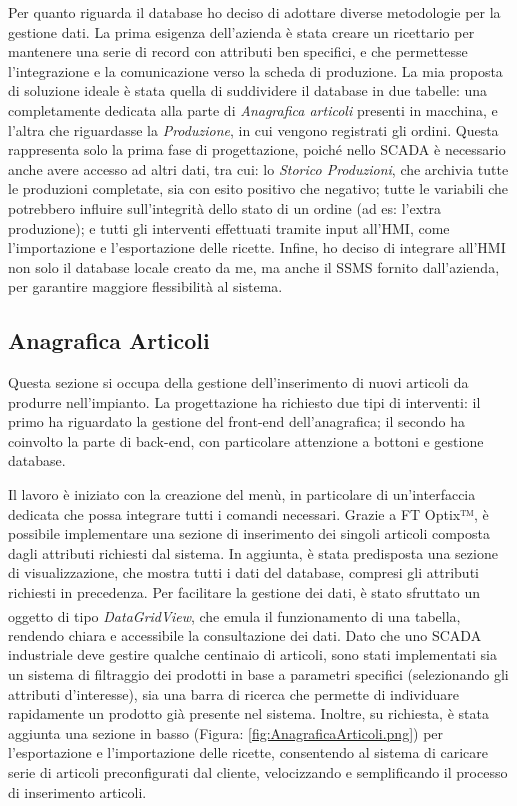 Per quanto riguarda il database ho deciso di adottare diverse metodologie per la gestione dati. La prima esigenza dell'azienda è stata creare un ricettario per mantenere una serie di record con attributi ben specifici, e che permettesse l'integrazione e la comunicazione verso la scheda di produzione. La mia proposta di soluzione ideale è stata quella di suddividere il database in due tabelle: una completamente dedicata alla parte di \textit{Anagrafica articoli} presenti in macchina, e l'altra che riguardasse la \textit{Produzione}, in cui vengono registrati gli ordini. Questa rappresenta solo la prima fase di progettazione, poiché nello SCADA è necessario anche avere accesso ad altri dati, tra cui: lo \textit{Storico Produzioni}, che archivia tutte le produzioni completate, sia con esito positivo che negativo; tutte le variabili che potrebbero influire sull'integrità dello stato di un ordine (ad es: l'extra produzione); e tutti gli interventi effettuati tramite input all'HMI, come l'importazione e l'esportazione delle ricette. Infine, ho deciso di integrare all'HMI non solo il database locale creato da me, ma anche il SSMS fornito dall'azienda, per garantire maggiore flessibilità al sistema.

\subsection{Anagrafica Articoli} 
Questa sezione si occupa della gestione dell'inserimento di nuovi articoli da produrre nell'impianto. La progettazione ha richiesto due tipi di interventi: il primo ha riguardato la gestione del front-end dell'anagrafica; il secondo ha coinvolto la parte di back-end, con particolare attenzione a bottoni e gestione database. 

Il lavoro è iniziato con la creazione del menù, in particolare di un'interfaccia dedicata che possa integrare tutti i comandi necessari. Grazie a FT Optix™, è possibile implementare una sezione di inserimento dei singoli articoli composta dagli attributi richiesti dal sistema. In aggiunta, è stata predisposta una sezione di visualizzazione, che mostra tutti i dati del database, compresi gli attributi richiesti in precedenza. Per facilitare la gestione dei dati, è stato sfruttato un oggetto di tipo \textit{DataGridView}\textsuperscript{\cite{factorytalk_datagrid_example}}, che emula il funzionamento di una tabella, rendendo chiara e accessibile la consultazione dei dati. Dato che uno SCADA industriale deve gestire qualche centinaio di articoli, sono stati implementati sia un sistema di filtraggio dei prodotti in base a parametri specifici (selezionando gli attributi d'interesse), sia una barra di ricerca che permette di individuare rapidamente un prodotto già presente nel sistema. Inoltre, su richiesta, è stata aggiunta una sezione in basso (Figura: \ref{fig:AnagraficaArticoli.png}) per l'esportazione e l'importazione delle ricette, consentendo al sistema di caricare serie di articoli preconfigurati dal cliente, velocizzando e semplificando il processo di inserimento articoli.

